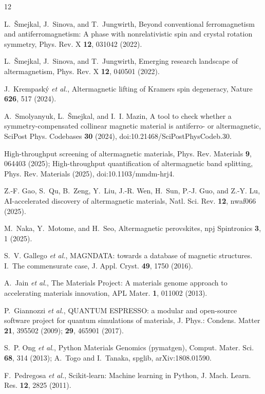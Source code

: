 \documentclass[aps,prmaterials,twocolumn,superscriptaddress,showkeys]{revtex4-2}
\begin{document}
\begin{thebibliography}{12}

 L.~\v{S}mejkal, J.~Sinova, and T.~Jungwirth,
Beyond conventional ferromagnetism and antiferromagnetism: A phase with
nonrelativistic spin and crystal rotation symmetry,
Phys. Rev. X \textbf{12}, 031042 (2022).

 L.~\v{S}mejkal, J.~Sinova, and T.~Jungwirth,
Emerging research landscape of altermagnetism,
Phys. Rev. X \textbf{12}, 040501 (2022).

 J.~Krempask\'y \textit{et al.},
Altermagnetic lifting of Kramers spin degeneracy,
Nature \textbf{626}, 517 (2024).

 A.~Smolyanyuk, L.~\v{S}mejkal, and I.~I. Mazin,
A tool to check whether a symmetry-compensated collinear magnetic material is
antiferro- or altermagnetic, SciPost Phys. Codebases \textbf{30} (2024),
doi:10.21468/SciPostPhysCodeb.30.

 High-throughput screening of altermagnetic materials,
Phys. Rev. Materials \textbf{9}, 064403 (2025); High-throughput quantification
of altermagnetic band splitting, Phys. Rev. Materials (2025),
doi:10.1103/mmdm-hrj4.

 Z.-F. Gao, S.~Qu, B.~Zeng, Y.~Liu, J.-R. Wen, H.~Sun,
P.-J. Guo, and Z.-Y. Lu, AI-accelerated discovery of altermagnetic materials,
Natl. Sci. Rev. \textbf{12}, nwaf066 (2025).

 M.~Naka, Y.~Motome, and H.~Seo, Altermagnetic perovskites,
npj Spintronics \textbf{3}, 1 (2025).

 S.~V. Gallego \textit{et al.}, MAGNDATA: towards a
database of magnetic structures. I.~The commensurate case,
J. Appl. Cryst. \textbf{49}, 1750 (2016).

 A.~Jain \textit{et al.}, The Materials Project: A materials
genome approach to accelerating materials innovation,
APL Mater. \textbf{1}, 011002 (2013).

 P.~Giannozzi \textit{et al.}, QUANTUM ESPRESSO: a
modular and open-source software project for quantum simulations of materials,
J. Phys.: Condens. Matter \textbf{21}, 395502 (2009); \textbf{29}, 465901
(2017).

 S.~P. Ong \textit{et al.}, Python Materials Genomics
(pymatgen), Comput. Mater. Sci. \textbf{68}, 314 (2013); A.~Togo and
I.~Tanaka, spglib, arXiv:1808.01590.

 F.~Pedregosa \textit{et al.}, Scikit-learn: Machine
learning in Python, J. Mach. Learn. Res. \textbf{12}, 2825 (2011).

\end{thebibliography}
\end{document}
